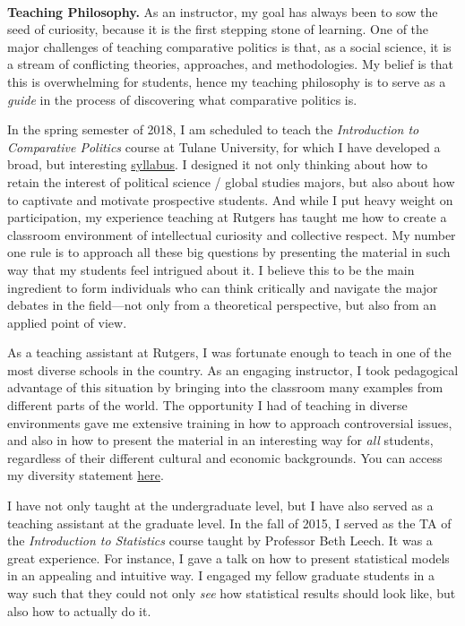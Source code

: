 \vspace{-2cm}{\bf \huge Teaching Statement}\\

{\bf Teaching Philosophy.} As an instructor, my goal has always been to sow the seed of curiosity, because it is the first stepping stone of learning. One of the major challenges of teaching comparative politics is that, as a social science, it is a stream of conflicting theories, approaches, and methodologies. My belief is that this is overwhelming for students, hence my teaching philosophy is to serve as a \emph{guide} in the process of discovering what comparative politics is.


In the spring semester of 2018, I am scheduled to teach the \emph{Introduction to Comparative Politics} course at Tulane University, for which I have developed a broad, but interesting \href{https://github.com/hbahamonde/Comparative_Politics_UGRAD/raw/master/Bahamonde_Comparative_Politics_Syllabus_UGRAD.pdf}{syllabus}. I designed it not only thinking about how to retain the interest of political science / global studies majors, but also about how to captivate and motivate prospective students. And while I put heavy weight on participation, my experience teaching at Rutgers has taught me how to create a classroom environment of intellectual curiosity and collective respect. My number one rule is to approach all these big questions by presenting the material in such way that my students feel intrigued about it. I believe this to be the main ingredient to form individuals who can think critically and navigate the major debates in the field---not only from a theoretical perspective, but also from an applied point of view.

As a teaching assistant at Rutgers, I was fortunate enough to teach in one of the most diverse schools in the country. As an engaging instructor, I took pedagogical advantage of this situation by bringing into the classroom many examples from different parts of the world. The opportunity I had of teaching in diverse environments gave me extensive training in how to approach controversial issues, and also in how to present the material in an interesting way for \emph{all} students, regardless of their different cultural and economic backgrounds. You can access my diversity statement \href{http://github.com/hbahamonde/Job_Market/raw/master/Bahamonde_Diversity_Statement.pdf}{here}.


I have not only taught at the undergraduate level, but I have also served as a teaching assistant at the graduate level. In the fall of 2015, I served as the TA of the \emph{Introduction to Statistics} course taught by Professor Beth Leech. It was a great experience. For instance, I gave a talk on how to present statistical models in an appealing and intuitive way. I engaged my fellow graduate students in a way such that they could not only \emph{see} how statistical results should look like, but also how to actually do it. 

